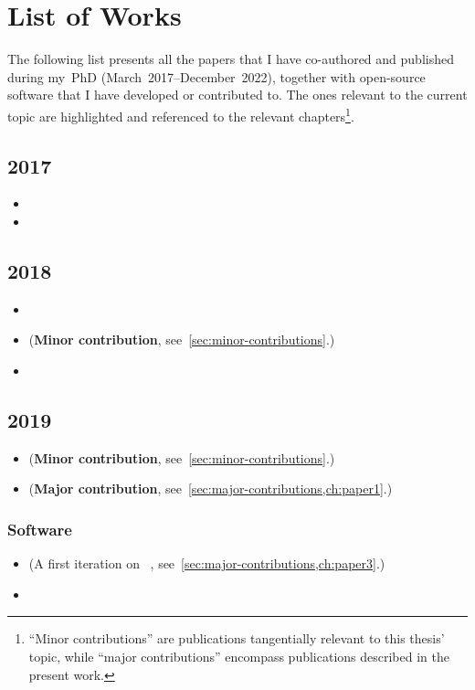 \chapter{List of Works}%
\label{ch:all-works}

The following list presents all the papers that I have co-authored and published
during my~PhD (March~2017--December~2022),
together with open-source software that I have developed or contributed to.
The ones relevant to the current topic are highlighted and referenced to
the relevant chapters\footnote{``Minor contributions'' are publications
	tangentially relevant to this thesis' topic, while ``major contributions''
	encompass publications described in the present work.}.

\section*{2017}
\begin{itemize}
	\item {}
	\item {}
\end{itemize}

\section*{2018}
\begin{itemize}
	\item {}
	\item {} (\textbf{Minor contribution}, see~\cref{sec:minor-contributions}.)
	\item {}
\end{itemize}

\section*{2019}
\begin{itemize}
	\item {} (\textbf{Minor contribution}, see~\cref{sec:minor-contributions}.)
	\item {} (\textbf{Major contribution}, see~\cref{sec:major-contributions,ch:paper1}.)
\end{itemize}

\subsection*{Software}
\begin{itemize}
	\item {} (A first iteration on
	      \overreact{}~\cite{Schneider_2022,overreact2021zenodo}, see~\cref{sec:major-contributions,ch:paper3}.)
	\item {}
\end{itemize}

